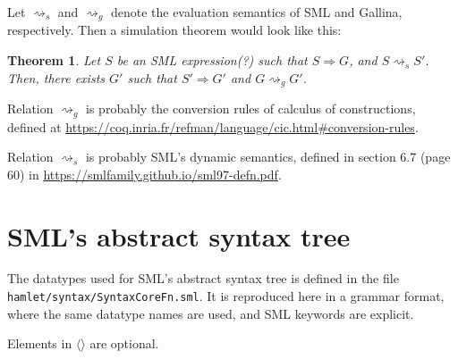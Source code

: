 \documentclass[a4paper,11pt]{article}
\newtheorem{theorem}{Theorem}
\newcommand\stog{\boldsymbol{\Longrightarrow}}
\begin{document}
Let $\rightsquigarrow_s$ and $\rightsquigarrow_g$ denote the evaluation
semantics of SML and Gallina, respectively. Then a simulation theorem would look
like this:

\begin{theorem}
Let $S$ be an SML expression(?) such that $S \stog G$, and 
$S \rightsquigarrow_s S'$. Then, there exists $G'$ such that
$S' \stog G'$ and $G \rightsquigarrow_g G'$.
\end{theorem}

Relation $\rightsquigarrow_g$ is probably the conversion rules of calculus of
constructions, defined at
\url{https://coq.inria.fr/refman/language/cic.html#conversion-rules}.

Relation $\rightsquigarrow_s$ is probably SML's dynamic semantics, defined in
section 6.7 (page 60) in \url{https://smlfamily.github.io/sml97-defn.pdf}.

\appendix

\section{SML's abstract syntax tree}

The datatypes used for SML's abstract syntax tree is defined in the file
\texttt{hamlet/syntax/SyntaxCoreFn.sml}. It is reproduced here in a grammar
format, where the same datatype names are used, and SML keywords are explicit.

Elements in $\langle\rangle$ are optional.
\end{document}
